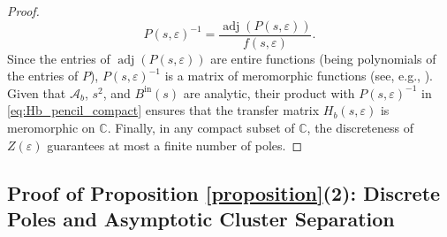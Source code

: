 \documentclass[11pt,a4paper]{article}
\numberwithin{equation}{section}
\begin{document}
\begin{proof}
\[
    P(s, \varepsilon)^{-1} = \frac{\operatorname{adj}(P(s, \varepsilon))}{f(s, \varepsilon)}.
\]
Since the entries of $\operatorname{adj}(P(s, \varepsilon))$ are entire functions (being polynomials of the entries of $P$), $P(s, \varepsilon)^{-1}$ is a matrix of meromorphic functions (see, e.g., \cite[Ch. 3]{complex2}). Given that $\mathcal{A}_b$, $s^2$, and $B^{\mathrm{in}}(s)$ are analytic, their product with $P(s, \varepsilon)^{-1}$ in \eqref{eq:Hb_pencil_compact} ensures that the transfer matrix $H_b(s, \varepsilon)$ is meromorphic on $\mathbb{C}$. Finally, in any compact subset of $\mathbb{C}$, the discreteness of $Z(\varepsilon)$ guarantees at most a finite number of poles.
\end{proof}

\subsection{Proof of Proposition \ref{proposition}(2): Discrete Poles and Asymptotic Cluster Separation}
\end{document}
